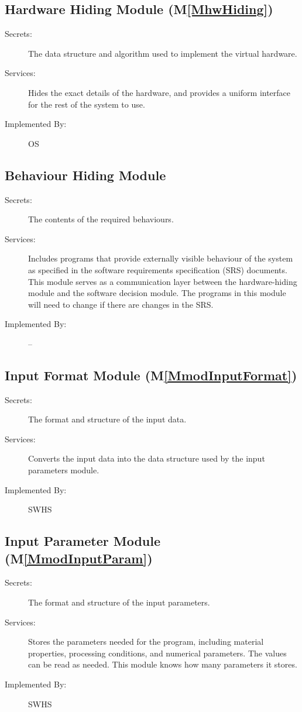 \documentclass[12pt]{article}
\begin{document}
\subsection{Hardware Hiding Module (M\ref{MhwHiding})}
\label{Sec:HardHidiModu()}
\begin{description}
\item[Secrets:]The data structure and algorithm used to implement the virtual hardware.
\item[Services:]Hides the exact details of the hardware, and provides a uniform interface for the rest of the system to use.
\item[Implemented By:]OS
\end{description}
\subsection{Behaviour Hiding Module}
\label{Sec:BehaHidiModu}
\begin{description}
\item[Secrets:]The contents of the required behaviours.
\item[Services:]Includes programs that provide externally visible behaviour of the system as specified in the software requirements specification (SRS) documents. This module serves as a communication layer between the hardware-hiding module and the software decision module. The programs in this module will need to change if there are changes in the SRS.
\item[Implemented By:]--
\end{description}
\subsection{Input Format Module (M\ref{MmodInputFormat})}
\label{Sec:InpuFormModu()}
\begin{description}
\item[Secrets:]The format and structure of the input data.
\item[Services:]Converts the input data into the data structure used by the input parameters module.
\item[Implemented By:]SWHS
\end{description}
\subsection{Input Parameter Module (M\ref{MmodInputParam})}
\label{Sec:InpuParaModu()}
\begin{description}
\item[Secrets:]The format and structure of the input parameters.
\item[Services:]Stores the parameters needed for the program, including material properties, processing conditions, and numerical parameters. The values can be read as needed. This module knows how many parameters it stores.
\item[Implemented By:]SWHS
\end{description}
\end{document}

